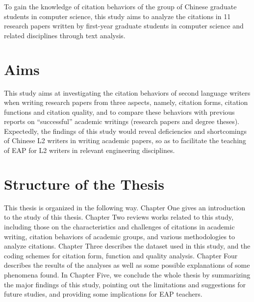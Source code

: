 To gain the knowledge of citation behaviors of the group of Chinese graduate students in computer science, this study aims to analyze the citations in 11 research papers written by first-year graduate students in computer science and related disciplines through text analysis.

\section{Aims}
This study aims at investigating the citation behaviors of second language writers when writing research papers from three aspects, namely, citation forms, citation functions and citation quality, and to compare these behaviors with previous reports on “successful” academic writings (research papers and degree theses). Expectedly, the findings of this study would reveal deficiencies and shortcomings of Chinese L2 writers in writing academic papers, so as to facilitate the teaching of EAP for L2 writers in relevant engineering disciplines.

\section{Structure of the Thesis}
This thesis is organized in the following way. Chapter One gives an introduction to the study of this thesis. Chapter Two reviews works related to this study, including those on the characteristics and challenges of citations in academic writing, citation behaviors of academic groups, and various methodologies to analyze citations. Chapter Three describes the dataset used in this study, and the coding schemes for citation form, function and quality analysis. Chapter Four describes the results of the analyses as well as some possible explanations of some phenomena found. In Chapter Five, we conclude the whole thesis by summarizing the major findings of this study, pointing out the limitations and suggestions for future studies, and providing some implications for EAP teachers.